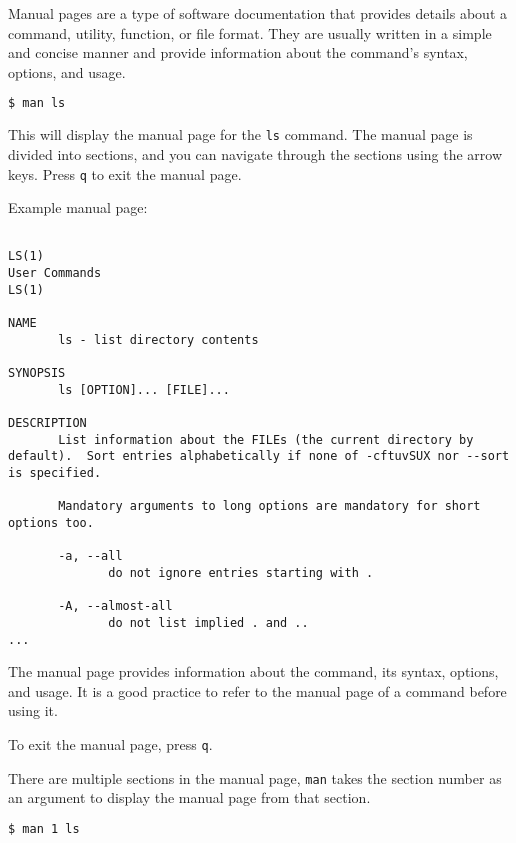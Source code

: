 \begin{definition}
  Manual pages are a type of software documentation that provides details about a command, utility, function, or file format. They are usually written in a simple and concise manner and provide information about the command's syntax, options, and usage.
\end{definition}

\begin{lstlisting}[language=bash]
  $ man ls
\end{lstlisting}

This will display the manual page for the \texttt{ls} command. The manual page is divided into sections, and you can navigate through the sections using the arrow keys. Press \texttt{q} to exit the manual page.

Example manual page:

\begin{lstlisting}

LS(1)                                                                                User Commands                                                                               LS(1)

NAME
       ls - list directory contents

SYNOPSIS
       ls [OPTION]... [FILE]...

DESCRIPTION
       List information about the FILEs (the current directory by default).  Sort entries alphabetically if none of -cftuvSUX nor --sort is specified.

       Mandatory arguments to long options are mandatory for short options too.

       -a, --all
              do not ignore entries starting with .

       -A, --almost-all
              do not list implied . and ..
...
\end{lstlisting}

The manual page provides information about the command, its syntax, options, and usage.
It is a good practice to refer to the manual page of a command before using it.

To exit the manual page, press \texttt{q}.

There are multiple sections in the manual page, \texttt{man} takes the section number as an argument to display the manual page from that section.

\begin{lstlisting}[language=bash]
  $ man 1 ls
\end{lstlisting}

